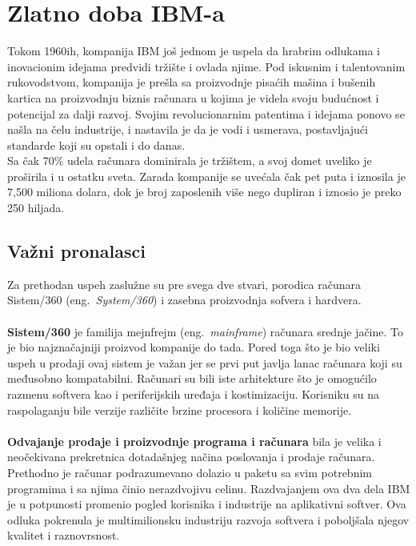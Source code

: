 \documentclass[a4paper]{article}
\begin{document}
\section{Zlatno doba IBM-a}
Tokom 1960ih, kompanija IBM još jednom je uspela da hrabrim odlukama i inovacionim idejama predvidi tržište i ovlada njime. Pod iskusnim i talentovanim rukovodstvom, kompanija je prešla sa proizvodnje pisaćih mašina i bušenih kartica na proizvodnju biznis računara u kojima je videla svoju budućnost i potencijal za dalji razvoj.%
Svojim revolucionarnim patentima i idejama ponovo se našla na čelu industrije, i nastavila je da je vodi i usmerava, postavljajući standarde koji su opstali i do danas.\\%
Sa čak 70\% udela računara dominirala je tržištem, a svoj domet uveliko je proširila i u ostatku sveta. Zarada kompanije se uvećala čak pet puta i iznosila je 7,500 miliona dolara, dok je broj zaposlenih više nego dupliran i iznosio je preko 250 hiljada.\\
\subsection{Važni pronalasci}
Za prethodan uspeh zaslužne su pre svega dve stvari, porodica računara Sistem/360 (eng.~{\em System/360}) i zasebna proizvodnja sofvera i hardvera.\\ \\%
\textbf{Sistem/360} je familija mejnfrejm (eng.~{\em mainframe}) računara srednje jačine. To je bio najznačajniji proizvod kompanije do tada. Pored toga što je bio veliki uspeh u prodaji ovaj sistem je važan jer se prvi put javlja lanac računara koji su međusobno kompatabilni.
Računari su bili iste arhitekture što je omogućilo razmenu softvera kao i periferijskih uređaja i kostimizaciju. Korisniku su na raspolaganju bile verzije različite brzine procesora i količine memorije. \\ \\
\textbf{Odvajanje prodaje i proizvodnje programa i računara} bila je velika i neočekivana prekretnica dotadašnjeg načina poslovanja i prodaje računara. Prethodno je računar podrazumevano dolazio u paketu sa svim potrebnim programima i sa njima činio nerazdvojivu celinu. Razdvajanjem ova dva dela IBM je u potpunosti promenio pogled korisnika i industrije na aplikativni softver. Ova odluka pokrenula je multimilionsku industriju razvoja softvera i poboljšala njegov kvalitet i raznovrsnost. 
\end{document}

